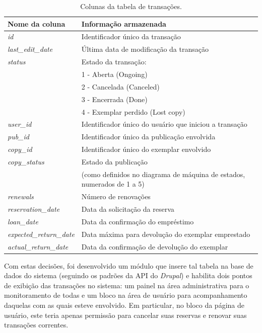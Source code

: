 \documentclass[a4paper]{article}
\begin{document}
\begin{table}[hc]
\centering
\caption{Colunas da tabela de transações.\label{transactions-table}}
\begin{tabular}{ll}
\hline
Nome da coluna & Informação armazenada \\
\hline
\textit{id}                        & {Identificador único da transação} \\
\hline
\textit{last\_edit\_date}        & {Última data de modificação da transação} \\
\hline
\textit{status}                    & Estado da transação:\\
&                                1 - Aberta (Ongoing)\\
&                                2 - Cancelada (Canceled)\\
&                                3 - Encerrada (Done)\\
&                                4 - Exemplar perdido (Lost copy) \\
\hline
\textit{user\_id}                & {Identificador único do usuário que iniciou a transação} \\
\hline
\textit{pub\_id}                & {Identificador único da publicação envolvida} \\
\hline
\textit{copy\_id}                & {Identificador único do exemplar envolvido} \\
\hline
\textit{copy\_status}            & Estado da publicação\\
&                                (como definidos no diagrama de máquina de estados, numerados de 1 a 5) \\
\hline
\textit{renewals}                & {Número de renovações} \\
\hline
\textit{reservation\_date}        & {Data da solicitação da reserva} \\
\hline
\textit{loan\_date}                & {Data da confirmação do empréstimo} \\
\hline
\textit{expected\_return\_date}    & {Data máxima para devolução do exemplar emprestado} \\
\hline
\textit{actual\_return\_date}        & {Data da confirmação de devolução do exemplar} \\
\hline
\end{tabular}
\end{table}

Com estas decisões, foi desenvolvido um módulo que insere tal tabela na base de dados do sistema (seguindo os padrões da API do \textit{Drupal}) e habilita dois pontos de exibição das transações no sistema: um painel na área administrativa para o monitoramento de todas e um bloco na área de usuário para acompanhamento daquelas com as quais esteve envolvido. Em particular, no bloco da página de usuário, este teria apenas permissão para cancelar suas reservas e renovar suas transações correntes. 
\end{document}
